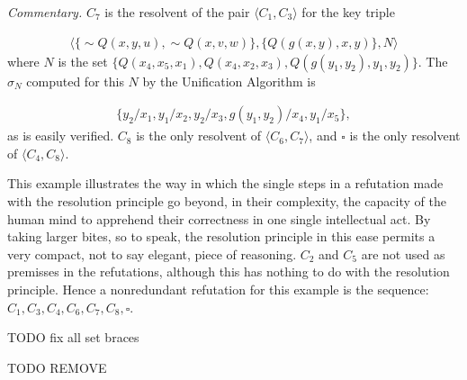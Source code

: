 \documentclass[8pt]{extarticle}
\begin{document}
\emph{Commentary.} $C_7$ is the resolvent of the pair $\langle C_1, C_3\rangle$ for the key triple

\begin{align*}
    \langle\{\sim Q(x,y,u), \sim Q(x,v,w)\}, \{ Q(g(x,y), x, y)\}, N\rangle
\end{align*}
\noindent
where $N$ is the set $\{Q(x_4, x_5, x_1), Q(x_4,x_2,x_3), Q(g(y_1,y_2),y_1,y_2)\}.$ The $\sigma_N$ computed for this $N$ by the Unification Algorithm is

\begin{align*}
    \{y_2/x_1, y_1/x_2, y_2/x_3, g(y_1, y_2)/x_4, y_1/x_5\},
\end{align*}
\noindent
as is easily verified. $C_8$ is the only resolvent of $\langle C_6, C_7\rangle$, and $\square$ is the only resolvent of $\langle C_4, C_8\rangle$.

This example illustrates the way in which the single steps in a refutation made with the resolution principle go beyond, in their complexity, the capacity of the human mind to apprehend their correctness in one single intellectual act. By taking larger bites, so to speak, the resolution principle in this ease permits a very compact, not to say elegant, piece of reasoning. $C_2$ and $C_5$ are not used as premisses in the refutations, although this has nothing to do with the resolution principle. Hence a nonredundant refutation for this example is the sequence: $C_1, C_3, C_4, C_6, C_7, C_8, \square$.

\newpage


\newpage

TODO fix all set braces

TODO REMOVE
\cite{church_1936}
\cite{davis_1960}
\cite{friedman_1963}
\cite{gilmore_1960}
\cite{robinson_1963}



\end{document}
